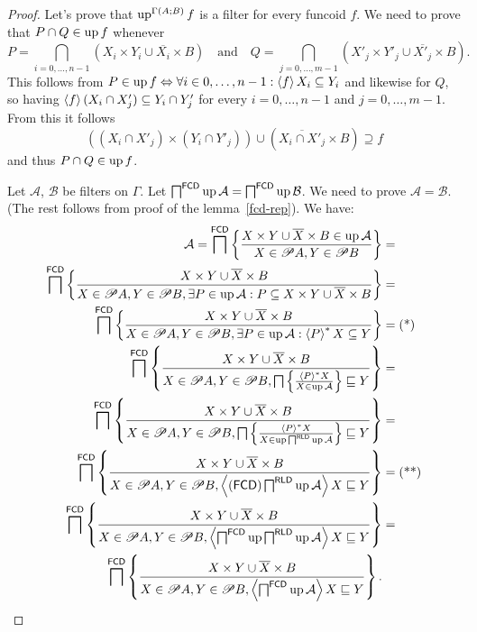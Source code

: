 \begin{proof}
Let's prove that $\operatorname{up}^{\Gamma(A;B)}f$ is a filter for every funcoid
$f$. We need to prove that $P\cap Q\in\operatorname{up} f$ whenever 
\[
P=\bigcap_{i=0,\ldots,n-1}\left(X_{i}\times Y_{i}\cup\overline{X_{i}}\times B\right)\quad\text{and}\quad Q=\bigcap_{j=0,\ldots,m-1}\left(X'_{j}\times Y'_{j}\cup\overline{X'_{j}}\times B\right).
\]
This follows from $P\in\operatorname{up} f\Leftrightarrow\forall i\in0,\ldots,n-1:\left\langle f\right\rangle X_{i}\subseteq Y_{i}$
and likewise for $Q$, so having $\left\langle f\right\rangle(X_{i}\cap X'_{j})\subseteq Y_{i}\cap Y'_{j}$
for every $i=0,\ldots,n-1$ and $j=0,\ldots,m-1$. From this it follows
\[
((X_{i}\cap X'_{j})\times(Y_{i}\cap Y'_{j}))\cup\left(\overline{X_{i}\cap X'_{j}}\times B\right)\supseteq f
\]
and thus $P\cap Q\in\operatorname{up} f$.

Let $\mathcal{A}$, $\mathcal{B}$ be filters on $\Gamma$. Let $\bigsqcap^{\mathsf{FCD}}\operatorname{up}\mathcal{A}=\bigsqcap^{\mathsf{FCD}}\operatorname{up}\mathcal{B}$.
We need to prove $\mathcal{A}=\mathcal{B}$. (The rest follows from
proof of the lemma~\ref{fcd-rep}). We have:
\begin{align*}
\mathcal{A}=\bigsqcap^{\mathsf{FCD}}\left\{ \frac{X\times Y\cup\overline{X}\times B\in\operatorname{up}\mathcal{A}}{X\in\mathscr{P} A,Y\in\mathscr{P} B}\right\} & =\\
\bigsqcap^{\mathsf{FCD}}\left\{ \frac{X\times Y\cup\overline{X}\times B}{X\in\mathscr{P} A,Y\in\mathscr{P} B,\exists P\in\operatorname{up}\mathcal{A}:P\subseteq X\times Y\cup\overline{X}\times B}\right\} & =\\
\bigsqcap^{\mathsf{FCD}}\left\{ \frac{X\times Y\cup\overline{X}\times B}{X\in\mathscr{P} A,Y\in\mathscr{P} B,\exists P\in\operatorname{up}\mathcal{A}:\left\langle P\right\rangle ^{\ast}X\subseteq Y}\right\} & =\text{(*)}\\
\bigsqcap^{\mathsf{FCD}}\left\{ \frac{X\times Y\cup\overline{X}\times B}{X\in\mathscr{P} A,Y\in\mathscr{P} B,\bigsqcap\left\{ \frac{\left\langle P\right\rangle ^{\ast}X}{X\in\operatorname{up}\mathcal{A}}\right\}\sqsubseteq Y}\right\} & =\\
\bigsqcap^{\mathsf{FCD}}\left\{ \frac{X\times Y\cup\overline{X}\times B}{X\in\mathscr{P} A,Y\in\mathscr{P} B,\bigsqcap\left\{ \frac{\left\langle P\right\rangle ^{\ast}X}{X\in\operatorname{up}\bigsqcap^{\mathsf{RLD}}\operatorname{up}\mathcal{A}}\right\}\sqsubseteq Y}\right\} & =\\
\bigsqcap^{\mathsf{FCD}}\left\{ \frac{X\times Y\cup\overline{X}\times B}{X\in\mathscr{P} A,Y\in\mathscr{P} B,\left\langle (\mathsf{FCD})\bigsqcap^{\mathsf{RLD}}\operatorname{up}\mathcal{A}\right\rangle X\sqsubseteq Y}\right\} & =\text{(**)}\\
\bigsqcap^{\mathsf{FCD}}\left\{ \frac{X\times Y\cup\overline{X}\times B}{X\in\mathscr{P} A,Y\in\mathscr{P} B,\left\langle \bigsqcap^{\mathsf{FCD}}\operatorname{up}\bigsqcap^{\mathsf{RLD}}\operatorname{up}\mathcal{A}\right\rangle X\sqsubseteq Y}\right\} & =\\
\bigsqcap^{\mathsf{FCD}}\left\{ \frac{X\times Y\cup\overline{X}\times B}{X\in\mathscr{P} A,Y\in\mathscr{P} B,\left\langle \bigsqcap^{\mathsf{FCD}}\operatorname{up}\mathcal{A}\right\rangle X\sqsubseteq Y}\right\}.
\end{align*}



\end{proof}
